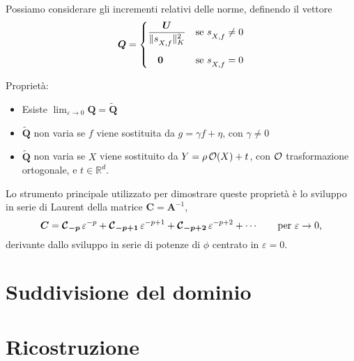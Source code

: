 \documentclass[10pt]{beamer}
\theoremstyle{definition}
\theoremstyle{plain}
\def\R{\mathbb R}
\def\Cal#1{{\cal #1}}
\def\norm#1{\Vert #1\Vert}
\def\hbyw#1#2{\vbox to #1{\vfil \hbox to #2{\hfil}}}
\def\lXf{{\lower.5ex\hbox{$\scriptstyle X, f$}}}
\begin{document}
\begin{frame}
Possiamo considerare gli incrementi relativi delle norme, definendo il vettore
$$
\bm Q = \begin{cases}\displaystyle
			\frac{\bm U}{\norm{s_\lXf}^2_K} & \text{se $s_\lXf \neq 0$}\\
			\hbyw{4ex}{1em}\bm 0 & \text{se $s_\lXf = 0$}
	       \end{cases}
$$

\alert{Proprietà}:
\begin{itemize}
\item Esiste $\lim_{\varepsilon\to 0} \bm Q = \widetilde{\bm Q}$
\item $\widetilde{\bm Q}$ non varia se $f$ viene sostituita da $g = \gamma f + \eta$, con $\gamma\neq 0$
\item $\widetilde{\bm Q}$ non varia se $X$ viene sostituito da $Y = \rho\, \Cal O(X) + t$, con $\Cal O$ trasformazione ortogonale, e $t\in\R^d$.
\end{itemize}

Lo strumento principale utilizzato per dimostrare queste proprietà è lo sviluppo in serie di Laurent della matrice $\bm C = \bm A^{-1}$, 
$$
\bm C = \bm{\Cal C}_{\bm{-p}}\,\varepsilon^{-p} + \bm{\Cal C}_{\bm{-p+1}}\,\varepsilon^{-p+1} +  \bm{\Cal C}_{\bm{-p+2}}\,\varepsilon^{-p+2}+\cdots\qquad \text{per $\varepsilon\to0$,}
$$
derivante dallo sviluppo in serie di potenze di $\phi$ centrato in $\varepsilon = 0$.



\end{frame}



\section{Suddivisione del dominio}
\begin{frame}
\end{frame}

\section{Ricostruzione}
\begin{frame}
\end{frame}
\end{document}

